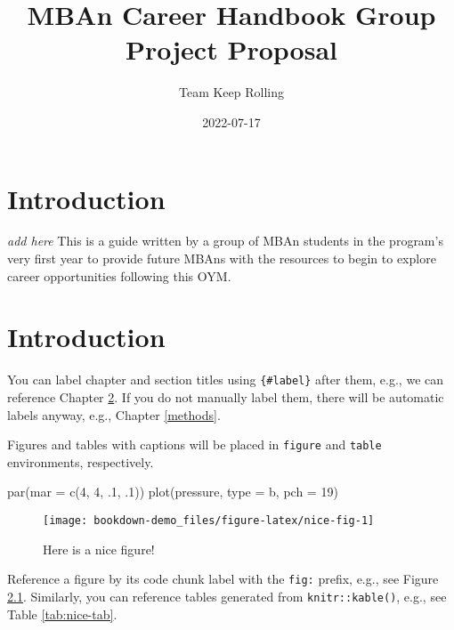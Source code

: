 \documentclass[
]{book}
\title{MBAn Career Handbook Group Project Proposal}
\author{Team Keep Rolling}
\date{2022-07-17}
\newenvironment{Shaded}{\begin{snugshade}}{\end{snugshade}}
\newcommand{\AttributeTok}[1]{\textcolor[rgb]{0.77,0.63,0.00}{#1}}
\newcommand{\DecValTok}[1]{\textcolor[rgb]{0.00,0.00,0.81}{#1}}
\newcommand{\FunctionTok}[1]{\textcolor[rgb]{0.00,0.00,0.00}{#1}}
\newcommand{\NormalTok}[1]{#1}
\newcommand{\StringTok}[1]{\textcolor[rgb]{0.31,0.60,0.02}{#1}}
\begin{document}
\maketitle

{
\setcounter{tocdepth}{1}
\tableofcontents
}
\hypertarget{Intro}{%
\chapter{Introduction}\label{Intro}}

\emph{add here}
This is a guide written by a group of MBAn students in the program's very first year to provide future MBAns with the resources to begin to explore career opportunities following this OYM.

\hypertarget{intro}{%
\chapter{Introduction}\label{intro}}

You can label chapter and section titles using \texttt{\{\#label\}} after them, e.g., we can reference Chapter \ref{intro}. If you do not manually label them, there will be automatic labels anyway, e.g., Chapter \ref{methods}.

Figures and tables with captions will be placed in \texttt{figure} and \texttt{table} environments, respectively.

\begin{Shaded}
\begin{Highlighting}[]
\FunctionTok{par}\NormalTok{(}\AttributeTok{mar =} \FunctionTok{c}\NormalTok{(}\DecValTok{4}\NormalTok{, }\DecValTok{4}\NormalTok{, .}\DecValTok{1}\NormalTok{, .}\DecValTok{1}\NormalTok{))}
\FunctionTok{plot}\NormalTok{(pressure, }\AttributeTok{type =} \StringTok{\textquotesingle{}b\textquotesingle{}}\NormalTok{, }\AttributeTok{pch =} \DecValTok{19}\NormalTok{)}
\end{Highlighting}
\end{Shaded}

\begin{figure}

{\centering \texttt{[image: bookdown-demo\_files/figure-latex/nice-fig-1]} 

}

\caption{Here is a nice figure!}\label{fig:nice-fig}
\end{figure}

Reference a figure by its code chunk label with the \texttt{fig:} prefix, e.g., see Figure \ref{fig:nice-fig}. Similarly, you can reference tables generated from \texttt{knitr::kable()}, e.g., see Table \ref{tab:nice-tab}.
\end{document}
